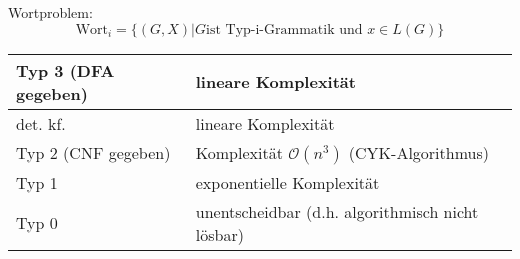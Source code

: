 \documentclass[9pt, a4paper]{article}
\begin{document}
Wortproblem:
$$\text{Wort}_i = \{(G, X)|G \text{ist Typ-i-Grammatik und }x \in L(G)\}$$
\begin{table}
	\begin{tabular}[h]{|l|l|}
		\hline
		Typ 3 (DFA gegeben) & lineare Komplexität\\
		\hline
		det. kf. & lineare Komplexität\\
		\hline
        Typ 2 (CNF gegeben) & Komplexität $\mathcal{O}(n^3)$ (CYK-Algorithmus)\\
		\hline
		Typ 1 & exponentielle Komplexität\\
		\hline
		Typ 0 & unentscheidbar (d.h. algorithmisch nicht lösbar)\\
		\hline
	\end{tabular}
\end{table}
\end{document}
